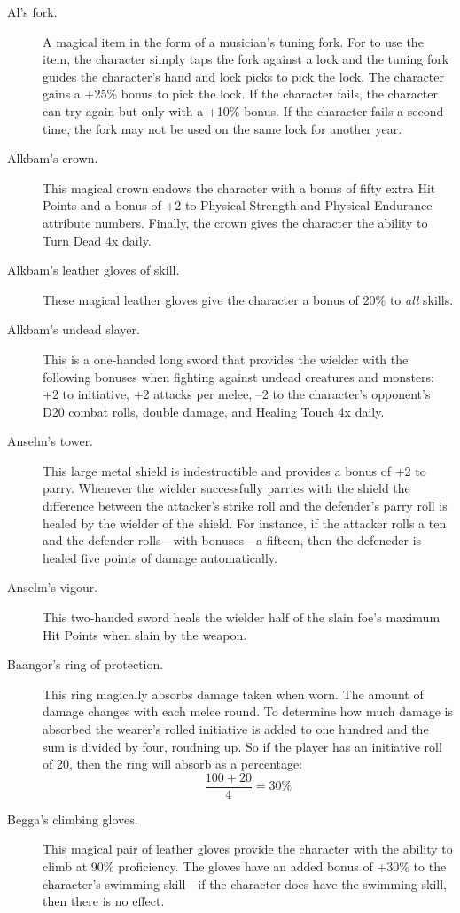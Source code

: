\begin{description}

\item[Al's fork.]
A magical item in the form of a musician's tuning
fork.
For to use the item, the character simply taps the
fork against a lock and the tuning fork guides the
character's hand and lock picks to pick the lock.
The character gains a +25\% bonus to pick the lock.
If the character fails, the character can try again
but only with a +10\% bonus.
If the character fails a second time,
the fork may not be used on the same lock for another
year.

\item[Alkbam's crown.]
This magical crown endows the character with a bonus
of fifty extra Hit Points and a bonus of +2 to Physical Strength
and Physical Endurance attribute numbers.
Finally,
the crown gives the character the ability to Turn Dead 4x daily.
\item[Alkbam's leather gloves of skill.]
These magical leather gloves give the character a
bonus of 20\% to \emph{all} skills.
\item[Alkbam's undead slayer.]
This is a one-handed long sword that provides the wielder
with the following bonuses when fighting against undead
creatures and monsters:
+2 to initiative,
+2 attacks per melee, --2 to the character's opponent's
D20 combat rolls, double damage,
and Healing Touch 4x daily.
\item[Anselm's tower.]
This large metal shield is indestructible and provides a bonus of +2 to parry.
Whenever the wielder successfully parries with the
shield the difference between the attacker's strike
roll and the defender's parry roll is healed by the
wielder of the shield.
For instance, if the attacker rolls a ten and the
defender rolls---with bonuses---a
fifteen, then the defeneder is healed five points of damage automatically.
\item[Anselm's vigour.]
This two-handed sword heals the wielder half of the
slain foe's maximum Hit Points when slain by the
weapon.
\item[Baangor's ring of protection.]
This ring magically absorbs damage taken when worn.
The amount of damage changes with each melee round.
To determine how much damage is absorbed the wearer's
rolled initiative is added to one hundred and the sum
is divided by four, roudning up.
So if the player has an initiative roll of 20, then
the ring will absorb as a percentage:\[
\frac{100 + 20}{4} = 30\%
\]

\item[Begga's climbing gloves.]
This magical pair of leather gloves
provide the character with the ability
to climb at 90\% proficiency.
The gloves have an added bonus of +30\%
to the character's swimming skill---if 
the
character does have the swimming skill,
then there is no effect.


\end{description}
